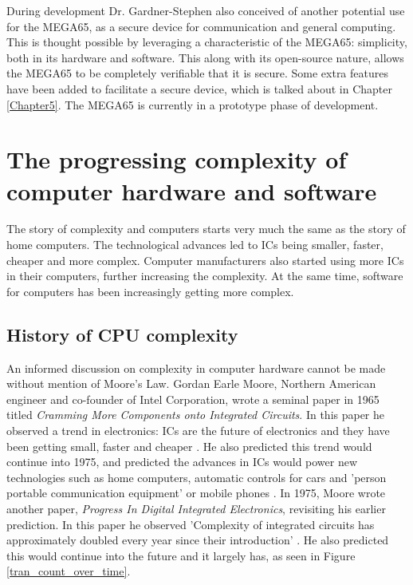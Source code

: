 During development Dr. Gardner-Stephen also conceived of another potential use for the MEGA65, as a secure device for communication and general computing. This is thought possible by leveraging a characteristic of the MEGA65: simplicity, both in its hardware and software. This along with its open-source nature, allows the MEGA65 to be completely verifiable that it is secure. Some extra features have been added to facilitate a secure device, which is talked about in Chapter \ref{Chapter5}. The MEGA65 is currently in a prototype phase of development.

\section{The progressing complexity of computer hardware and software}
\label{The progressing complexity of computer hardware and software}
The story of complexity and computers starts very much the same as the story of home computers. The technological advances led to ICs being smaller, faster, cheaper and more complex. Computer manufacturers also started using more ICs in their computers, further increasing the complexity. At the same time, software for computers has been increasingly getting more complex. 

\subsection{History of CPU complexity}
An informed discussion on complexity in computer hardware cannot be made without mention of Moore's Law. Gordan Earle Moore, Northern American engineer and co-founder of Intel Corporation, wrote a seminal paper in 1965 titled \textit{Cramming More Components onto Integrated Circuits}. In this paper he observed a trend in electronics: ICs are the future of electronics and they have been getting small, faster and cheaper
\cite{RN33}. He also predicted this trend would continue into 1975, and predicted the advances in ICs would power new technologies such as home computers, automatic controls for cars and 'person portable communication equipment' or mobile phones 
\cite{RN33}. In 1975, Moore wrote another paper, \textit{Progress In Digital Integrated Electronics}, revisiting his earlier prediction. In this paper he observed 'Complexity of integrated circuits has approximately doubled every year since their introduction' 
\cite{RN52}. He also predicted this would continue into the future and it largely has, as seen in Figure \ref{tran_count_over_time}. 

